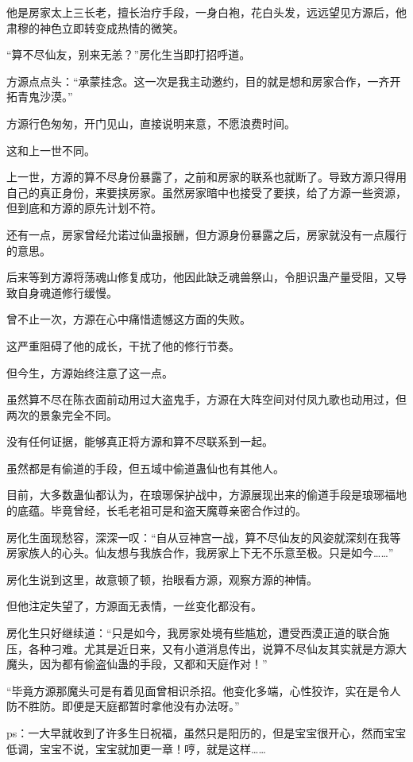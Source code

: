 \begin{this_body}
他是房家太上三长老，擅长治疗手段，一身白袍，花白头发，远远望见方源后，他肃穆的神色立即转变成热情的微笑。

“算不尽仙友，别来无恙？”房化生当即打招呼道。

方源点点头：“承蒙挂念。这一次是我主动邀约，目的就是想和房家合作，一齐开拓青鬼沙漠。”

方源行色匆匆，开门见山，直接说明来意，不愿浪费时间。

这和上一世不同。

上一世，方源的算不尽身份暴露了，之前和房家的联系也就断了。导致方源只得用自己的真正身份，来要挟房家。虽然房家暗中也接受了要挟，给了方源一些资源，但到底和方源的原先计划不符。

还有一点，房家曾经允诺过仙蛊报酬，但方源身份暴露之后，房家就没有一点履行的意思。

后来等到方源将荡魂山修复成功，他因此缺乏魂兽祭山，令胆识蛊产量受阻，又导致自身魂道修行缓慢。

曾不止一次，方源在心中痛惜遗憾这方面的失败。

这严重阻碍了他的成长，干扰了他的修行节奏。

但今生，方源始终注意了这一点。

虽然算不尽在陈衣面前动用过大盗鬼手，方源在大阵空间对付凤九歌也动用过，但两次的景象完全不同。

没有任何证据，能够真正将方源和算不尽联系到一起。

虽然都是有偷道的手段，但五域中偷道蛊仙也有其他人。

目前，大多数蛊仙都认为，在琅琊保护战中，方源展现出来的偷道手段是琅琊福地的底蕴。毕竟曾经，长毛老祖可是和盗天魔尊亲密合作过的。

房化生面现愁容，深深一叹：“自从豆神宫一战，算不尽仙友的风姿就深刻在我等房家族人的心头。仙友想与我族合作，我房家上下无不乐意至极。只是如今……”

房化生说到这里，故意顿了顿，抬眼看方源，观察方源的神情。

但他注定失望了，方源面无表情，一丝变化都没有。

房化生只好继续道：“只是如今，我房家处境有些尴尬，遭受西漠正道的联合施压，各种刁难。尤其是近日来，又有小道消息传出，说算不尽仙友其实就是方源大魔头，因为都有偷盗仙蛊的手段，又都和天庭作对！”

“毕竟方源那魔头可是有着见面曾相识杀招。他变化多端，心性狡诈，实在是令人防不胜防。即便是天庭都暂时拿他没有办法呀。”

ps：一大早就收到了许多生日祝福，虽然只是阳历的，但是宝宝很开心，然而宝宝低调，宝宝不说，宝宝就加更一章！哼，就是这样……

\end{this_body}

